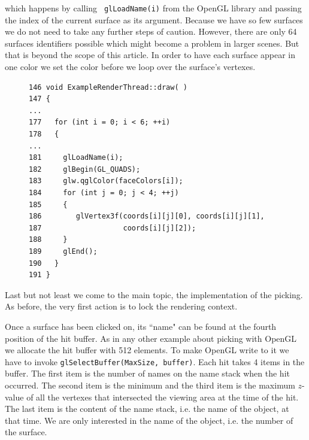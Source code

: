 \documentclass[jou,noapacite]{apa}
\begin{document}
which happens by calling \lstinline| glLoadName(i)| from the OpenGL library and
passing the index of the current surface as its argument.
%
Because we have so few surfaces we do not need to take any further steps of
caution.
%
However, there are only 64 surfaces identifiers possible which might become a
problem in larger scenes.
%
But that is beyond the scope of this article.
%
In order to have each surface appear in one color we set the color before we
loop over the surface's vertexes.
\begin{figure}[h]
\begin{lstlisting}[basicstyle=\scriptsize]
146 void ExampleRenderThread::draw( )
147 {
...
177   for (int i = 0; i < 6; ++i)
178   {
...
181     glLoadName(i);
182     glBegin(GL_QUADS);
183     glw.qglColor(faceColors[i]);
184     for (int j = 0; j < 4; ++j)
185     {
186        glVertex3f(coords[i][j][0], coords[i][j][1],
187                   coords[i][j][2]);
188     }
189     glEnd();
190   }
191 }
\end{lstlisting}
\end{figure}
%
Last but not least we come to the main topic, the implementation of the picking.
%
As before, the very first action is to lock the rendering context.

Once a surface has been clicked on, its ``name" can be found at the fourth
position of the hit buffer.
%
As in any other example about picking with OpenGL we allocate the hit buffer
with 512 elements.
%
To make OpenGL write to it we have to invoke \lstinline|glSelectBuffer(MaxSize, buffer)|.
Each hit takes 4 items in the buffer.
%
The first item is the number of names on the name stack when the hit occurred.
%
The second item is the minimum and the third item is the maximum $z$-value of
all the vertexes that intersected the viewing area at the time of the hit.
%
The last item is the content of the name stack, i.e. the name of the object,
at that time.
%
We are only interested in the name of the object, i.e. the number of the
surface.
\end{document}
